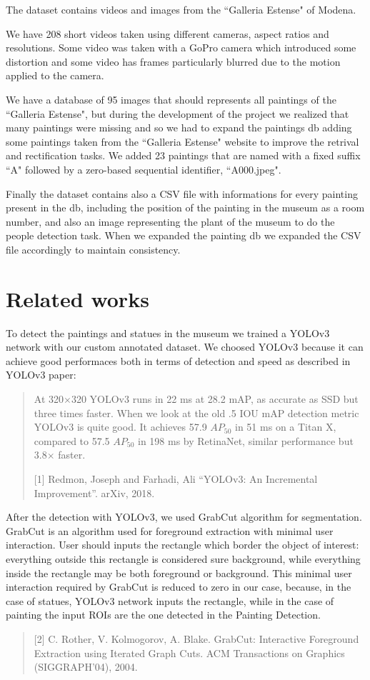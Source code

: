 \documentclass[10pt,twocolumn,letterpaper]{article}
\begin{document}
The dataset contains videos and images from the ``Galleria Estense" of Modena.

We have 208 short videos taken using different cameras, aspect ratios and resolutions. 
Some video was taken with a GoPro camera which introduced some distortion and
some video has frames particularly blurred due to the motion applied to the camera.

We have a database of 95 images that should represents all paintings of the ``Galleria Estense", 
but during the development of the project we realized that many paintings were missing 
and so we had to expand the paintings db adding some paintings taken from the ``Galleria Estense" 
website to improve the retrival and rectification tasks. We added 23 paintings that are named 
with a fixed suffix ``A" followed by a zero-based sequential identifier, \eg ``A000.jpeg".

Finally the dataset contains also a CSV file with informations for every painting present
in the db, including the position of the painting in the museum as a room number, and also an image
representing the plant of the museum to do the people detection task. When we expanded the 
painting db we expanded the CSV file accordingly to maintain consistency.

\section{Related works}

To detect the paintings and statues in the museum we trained a YOLOv3 network with
our custom annotated dataset. We choosed YOLOv3 because it can achieve good performaces
both in terms of detection and speed as described in YOLOv3 paper:
\begin{quote}
   At 320$\times$320 YOLOv3 runs in 22 ms at 28.2 mAP, as accurate as SSD but three times faster. 
   When we look at the old .5 IOU mAP detection metric YOLOv3 is quite good. It achieves
   57.9 $AP_{50}$ in 51 ms on a Titan X, compared to 57.5 $AP_{50}$ in 198 ms by RetinaNet,
   similar performance but 3.8$\times$ faster.

   [1] Redmon, Joseph and Farhadi, Ali 
   ``YOLOv3: An Incremental Improvement''.
   arXiv, 2018.
\end{quote}

After the detection with YOLOv3, we used GrabCut algorithm for segmentation.
GrabCut is an algorithm used for foreground extraction with minimal user interaction.
User should inputs the rectangle which border the object of interest: everything outside this rectangle is considered sure background, while everything inside the rectangle may be both foreground or background.
This minimal user interaction required by GrabCut is reduced to zero in our case, because, in the case of statues, YOLOv3 network inputs the rectangle, while in the case of painting the input ROIs are the one detected in the Painting Detection.
\begin{quote}
[2] C. Rother, V. Kolmogorov, A. Blake. GrabCut: Interactive Foreground Extraction using Iterated Graph Cuts. ACM
Transactions on Graphics (SIGGRAPH'04), 2004.
\end{quote}
\end{document}
